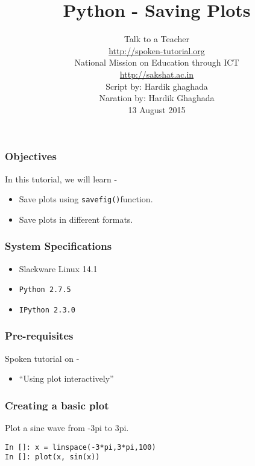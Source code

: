 \documentclass[17pt,compress]{beamer}
\author[FOSSEE]{}
\institute[IIT Bombay]{}
\date[]{}
\begin{document}
\sffamily \bfseries
\title
[Saving Plots]
{Python - Saving Plots}
\author
[FOSSEE, IIT - Bombay]
{\small Talk to a Teacher\\{\color{blue}\url{http://spoken-tutorial.org}}\\National Mission on Education
 through ICT\\{\color{blue}\url{http://sakshat.ac.in}} \\[0.5cm]{\tiny Script by: Hardik ghaghada \\ Naration by: Hardik Ghaghada \\ 13 August 2015}}

\begin{frame}
   \titlepage
\end{frame}
\begin{frame}
\frametitle{Objectives} 
\label{sec-2}
In this tutorial, we will learn -\pause
\begin{itemize}
\item Save plots using \texttt{savefig()}function. \pause
\item Save plots in different formats.
\end{itemize}
\end{frame}
\begin{frame}
\frametitle{System Specifications}\pause
\begin{itemize}
\item Slackware Linux 14.1\pause
\item \texttt{Python 2.7.5} \pause
\item \texttt{IPython 2.3.0}
\end{itemize}
\end{frame}
\begin{frame}
\frametitle{Pre-requisites}
\label{sec-3}
Spoken tutorial on -
\begin{itemize}
\item ``Using plot interactively''
\end{itemize}
\end{frame}
\begin{frame}[fragile]
\frametitle{Creating a basic plot}
\label{sec-4}
Plot a sine wave from -3pi to 3pi.\pause
\begin{small}
\lstset{language=Python}
\begin{lstlisting}
In []: x = linspace(-3*pi,3*pi,100)
In []: plot(x, sin(x))
\end{lstlisting}
\end{small}
\end{frame}
\end{document}
